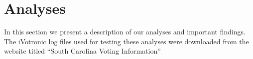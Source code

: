 \section{Analyses}
In this section we present a description of our analyses and important findings.  The iVotronic log files used for testing these analyses were downloaded from the website titled ``South Carolina Voting Information'' %






